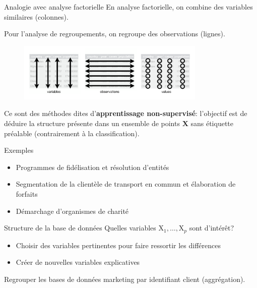 \documentclass[
  ignorenonframetext,
]{beamer}
\providecommand{\tightlist}{%
  \setlength{\itemsep}{0pt}\setlength{\parskip}{0pt}}\usepackage{longtable,booktabs,array}
\begin{document}
\begin{frame}{Analogie avec analyse factorielle}
\protect\hypertarget{analogie-avec-analyse-factorielle}{}
En analyse factorielle, on combine des variables similaires (colonnes).

Pour l'analyse de regroupements, on regroupe des observations (lignes).

\begin{figure}

{\centering \includegraphics[width=0.8\textwidth,height=\textheight]{figures/tidy-data.png}

}

\end{figure}

Ce sont des méthodes dites d'\textbf{apprentissage non-supervisé}:
l'objectif est de déduire la structure présente dans un ensemble de
points \(\mathbf{X}\) sans étiquette préalable (contrairement à la
classification).
\end{frame}

\begin{frame}{Exemples}
\protect\hypertarget{exemples}{}
\begin{itemize}
\tightlist
\item
  Programmes de fidélisation et résolution d'entités
\item
  Segmentation de la clientèle de transport en commun et élaboration de
  forfaits
\item
  Démarchage d'organismes de charité
\end{itemize}
\end{frame}

\begin{frame}{Structure de la base de données}
\protect\hypertarget{structure-de-la-base-de-donnuxe9es}{}
Quelles variables \(\mathrm{X}_1, \ldots, \mathrm{X}_p\) sont d'intérêt?

\begin{itemize}
\tightlist
\item
  Choisir des variables pertinentes pour faire ressortir les différences
\item
  Créer de nouvelles variables explicatives
\end{itemize}

Regrouper les bases de données marketing par identifiant client
(aggrégation).
\end{frame}
\end{document}
